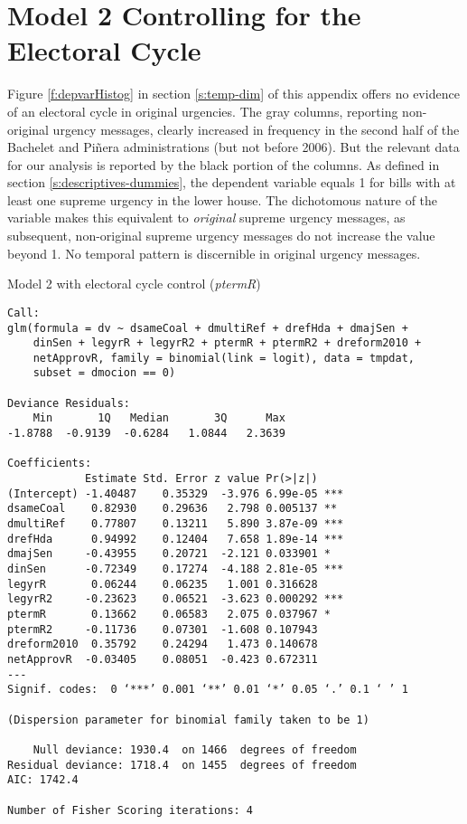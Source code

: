\documentclass[letter,12pt]{article}
\begin{document}
\section{Model 2 Controlling for the Electoral Cycle}

Figure \ref{f:depvarHistog} in section \ref{s:temp-dim} of this appendix offers no evidence of an electoral cycle in original urgencies. The gray columns, reporting non-original urgency messages, clearly increased in frequency in the second half of the Bachelet and Piñera administrations (but not before 2006). But the relevant data for our analysis is reported by the black portion of the columns. As defined in section \ref{s:descriptives-dummies}, the dependent variable equals 1 for bills with at least one supreme urgency in the lower house. The dichotomous nature of the variable makes this equivalent to \emph{original} supreme urgency messages, as subsequent, non-original supreme urgency messages do not increase the value beyond 1. No temporal pattern is discernible in original urgency messages.

\begin{table}
  \begin{footnotesize}
\caption{Model 2 with electoral cycle control (\emph{ptermR})}\label{t:m2elect}
\centering
\begin{verbatim}
Call:
glm(formula = dv ~ dsameCoal + dmultiRef + drefHda + dmajSen + 
    dinSen + legyrR + legyrR2 + ptermR + ptermR2 + dreform2010 + 
    netApprovR, family = binomial(link = logit), data = tmpdat, 
    subset = dmocion == 0)

Deviance Residuals: 
    Min       1Q   Median       3Q      Max  
-1.8788  -0.9139  -0.6284   1.0844   2.3639  

Coefficients:
            Estimate Std. Error z value Pr(>|z|)    
(Intercept) -1.40487    0.35329  -3.976 6.99e-05 ***
dsameCoal    0.82930    0.29636   2.798 0.005137 ** 
dmultiRef    0.77807    0.13211   5.890 3.87e-09 ***
drefHda      0.94992    0.12404   7.658 1.89e-14 ***
dmajSen     -0.43955    0.20721  -2.121 0.033901 *  
dinSen      -0.72349    0.17274  -4.188 2.81e-05 ***
legyrR       0.06244    0.06235   1.001 0.316628    
legyrR2     -0.23623    0.06521  -3.623 0.000292 ***
ptermR       0.13662    0.06583   2.075 0.037967 *  
ptermR2     -0.11736    0.07301  -1.608 0.107943    
dreform2010  0.35792    0.24294   1.473 0.140678    
netApprovR  -0.03405    0.08051  -0.423 0.672311    
---
Signif. codes:  0 ‘***’ 0.001 ‘**’ 0.01 ‘*’ 0.05 ‘.’ 0.1 ‘ ’ 1

(Dispersion parameter for binomial family taken to be 1)

    Null deviance: 1930.4  on 1466  degrees of freedom
Residual deviance: 1718.4  on 1455  degrees of freedom
AIC: 1742.4

Number of Fisher Scoring iterations: 4
\end{verbatim}
\end{footnotesize}
\end{table}
\end{document}
